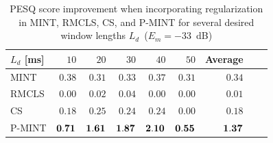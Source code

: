 \documentclass[draftcls,onecolumn,11pt]{IEEEtran}
\begin{document}
\begin{table}[h]
\centering
\caption{PESQ score improvement when incorporating regularization in MINT, RMCLS, CS, and P-MINT for several desired window lengths $L_d$~($E_m = -33$~dB)}
\label{tbl: pesq1}
\begin{tabular}{|l|r|r|r|r|r|r|r|r|}
\hline
$L_d$ [ms] & $10$ & $20$ & $30$ & $40$ & $50$ & Average  \\
\hline
MINT & $0.38$ & $0.31$ & $0.33$ & $0.37$ & $0.31$ & $0.34$ \\
\hline
RMCLS & $0.00$ & $0.02$ & $0.04$ & $0.00$ & $0.00$ & $0.01$ \\
\hline
CS & $0.18$ & $0.25$ & $0.24$ & $0.24$ & $0.00$ & $0.18$ \\
\hline
P-MINT & $\bf{0.71}$ & $\bf{1.61}$ & $\bf{1.87}$ & $\bf{2.10}$ & $\bf{0.55}$ & $\bf{1.37}$ \\
\hline
\end{tabular}

\end{table}
\end{document}
